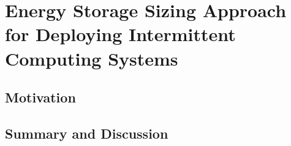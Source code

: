\chapter{Energy Storage Sizing Approach for Deploying Intermittent Computing Systems}

\section{Motivation}




\section{Summary and Discussion}